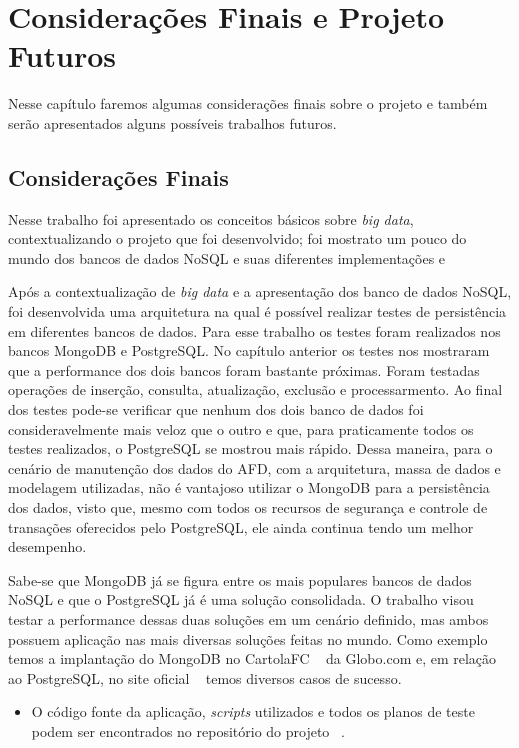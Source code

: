 \chapter{Considerações Finais e Projeto Futuros}

Nesse capítulo faremos algumas considerações finais sobre o projeto e também serão apresentados alguns possíveis trabalhos futuros.

\section{Considerações Finais}

Nesse trabalho foi apresentado os conceitos básicos sobre \textit{big data}, contextualizando o projeto que foi desenvolvido; foi mostrato um pouco do mundo dos bancos de dados NoSQL e suas diferentes implementações e 

Após a contextualização de \textit{big data} e a apresentação dos banco de dados NoSQL, foi desenvolvida uma arquitetura na qual é possível realizar testes de persistência em diferentes bancos de dados. Para esse trabalho os testes foram realizados nos bancos MongoDB e PostgreSQL. No capítulo anterior os testes nos mostraram que a performance dos dois bancos foram bastante próximas. Foram testadas operações de inserção, consulta, atualização, exclusão e processarmento. Ao final dos testes pode-se verificar que nenhum dos dois banco de dados foi consideravelmente mais veloz que o outro e que, para praticamente todos os testes realizados, o PostgreSQL se mostrou mais rápido. Dessa maneira, para o cenário de manutenção dos dados do AFD, com a arquitetura, massa de dados e modelagem utilizadas, não é vantajoso utilizar o MongoDB para a persistência dos dados, visto que, mesmo com todos os recursos de segurança e controle de transações oferecidos pelo PostgreSQL, ele ainda continua tendo um melhor desempenho.

Sabe-se que MongoDB já se figura entre os mais populares bancos de dados NoSQL e que o PostgreSQL já é uma solução consolidada. O trabalho visou testar a performance dessas duas soluções em um cenário definido, mas ambos possuem aplicação nas mais diversas soluções feitas no mundo. Como exemplo temos a implantação do MongoDB no CartolaFC ~\cite{mongocartola} da Globo.com e, em relação ao PostgreSQL, no site oficial ~\cite{usecasepostgresql}  temos diversos casos de sucesso.

\begin{itemize}
	\item O código fonte da aplicação, \textit{scripts} utilizados e todos os planos de teste podem ser encontrados no repositório do projeto ~\cite{github}.
\end{itemize}

